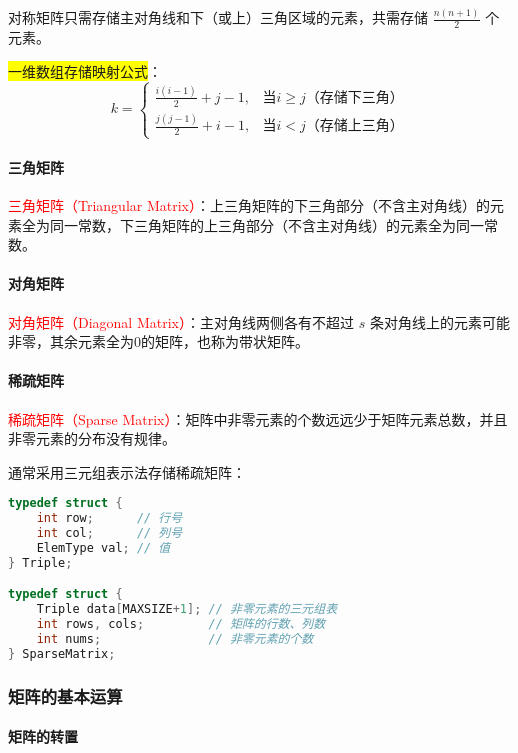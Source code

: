 \documentclass{../../note}
\begin{document}
对称矩阵只需存储主对角线和下（或上）三角区域的元素，共需存储 $\frac{n(n+1)}{2}$ 个元素。

\colorbox{yellow}{一维数组存储映射公式}：
\begin{equation}
  k =
  \begin{cases}
    \frac{i(i-1)}{2} + j - 1, & \text{当} i \geq j \text{（存储下三角）} \\
    \frac{j(j-1)}{2} + i - 1, & \text{当} i < j \text{（存储上三角）}
  \end{cases}
\end{equation}

\paragraph{三角矩阵}

\textcolor{red}{三角矩阵（Triangular Matrix）}：上三角矩阵的下三角部分（不含主对角线）的元素全为同一常数，下三角矩阵的上三角部分（不含主对角线）的元素全为同一常数。

\paragraph{对角矩阵}

\textcolor{red}{对角矩阵（Diagonal Matrix）}：主对角线两侧各有不超过 $s$ 条对角线上的元素可能非零，其余元素全为0的矩阵，也称为带状矩阵。

\paragraph{稀疏矩阵}

\textcolor{red}{稀疏矩阵（Sparse Matrix）}：矩阵中非零元素的个数远远少于矩阵元素总数，并且非零元素的分布没有规律。

通常采用三元组表示法存储稀疏矩阵：
\begin{lstlisting}[language=C]
typedef struct {
    int row;      // 行号
    int col;      // 列号
    ElemType val; // 值
} Triple;

typedef struct {
    Triple data[MAXSIZE+1]; // 非零元素的三元组表
    int rows, cols;         // 矩阵的行数、列数
    int nums;               // 非零元素的个数
} SparseMatrix;
\end{lstlisting}

\subsubsection{矩阵的基本运算}

\paragraph{矩阵的转置}
\end{document}
